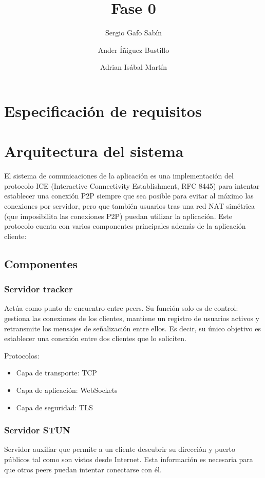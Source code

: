\documentclass{article}
\title{Fase 0}
\author{Sergio Gafo Sabín \and Ander Íñiguez Bustillo \and Adrian Isábal Martín}
\begin{document}
    \maketitle %
    \newpage %
    \section{Especificación de requisitos}
    \section{Arquitectura del sistema}
    El sistema de comunicaciones de la aplicación es una implementación del protocolo ICE (Interactive Connectivity Establishment, RFC 8445) para intentar establecer una conexión P2P siempre que sea posible para evitar al máximo las conexiones por servidor, pero que también usuarios tras una red NAT simétrica (que imposibilita las conexiones P2P) puedan utilizar la aplicación. Este protocolo cuenta con varios componentes principales además de la aplicación cliente:
    
    \subsection{Componentes}
    \subsubsection{Servidor tracker}
    Actúa como punto de encuentro entre peers. Su función solo es de control: gestiona las conexiones de los clientes, mantiene un registro de usuarios activos y retransmite los mensajes de señalización entre ellos. Es decir, su único objetivo es establecer una conexión entre dos clientes que lo soliciten. \vspace{1em}
    
    Protocolos:
    
    \begin{itemize}
       \item Capa de transporte: TCP
       \item Capa de aplicación: WebSockets
       \item Capa de seguridad: TLS
    \end{itemize}

    
    \subsubsection{Servidor STUN}
    Servidor auxiliar que permite a un cliente descubrir su dirección y puerto públicos tal como son vistos desde Internet. Esta información es necesaria para que otros peers puedan intentar conectarse con él. \vspace{1em}
    
\end{document}
